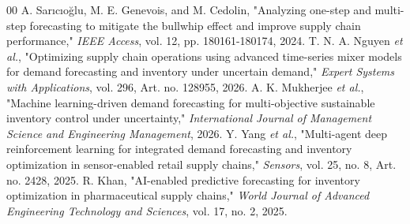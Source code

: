 \documentclass[9pt,conference]{IEEEtran}
\providecommand{\syscite}[1]{}
\begin{document}
\begin{thebibliography}{00}
 A. Sarıcıoğlu, M. E. Genevois, and M. Cedolin, "Analyzing one-step and multi-step forecasting to mitigate the bullwhip effect and improve supply chain performance," \textit{IEEE Access}, vol. 12, pp. 180161-180174, 2024. \syscite{[cite: 1]}
 T. N. A. Nguyen \textit{et al.}, "Optimizing supply chain operations using advanced time-series mixer models for demand forecasting and inventory under uncertain demand," \textit{Expert Systems with Applications}, vol. 296, Art. no. 128955, 2026. \syscite{[cite: 1]}
 A. K. Mukherjee \textit{et al.}, "Machine learning-driven demand forecasting for multi-objective sustainable inventory control under uncertainty," \textit{International Journal of Management Science and Engineering Management}, 2026. \syscite{[cite: 1]}
 Y. Yang \textit{et al.}, "Multi-agent deep reinforcement learning for integrated demand forecasting and inventory optimization in sensor-enabled retail supply chains," \textit{Sensors}, vol. 25, no. 8, Art. no. 2428, 2025. \syscite{[cite: 1]}
 R. Khan, "AI-enabled predictive forecasting for inventory optimization in pharmaceutical supply chains," \textit{World Journal of Advanced Engineering Technology and Sciences}, vol. 17, no. 2, 2025. \syscite{[cite: 1]}

\end{thebibliography}
\end{document}
